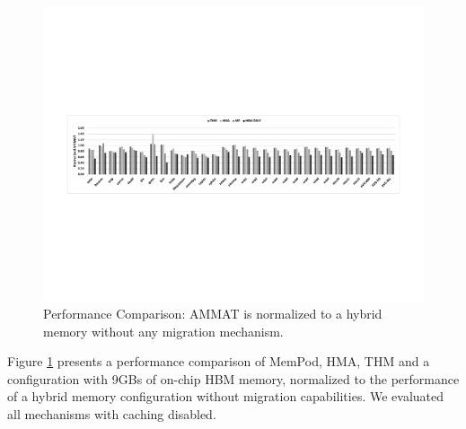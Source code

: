 \begin{figure}[t]
  \includegraphics[width=\textwidth]{figures/performance_over_nlm.pdf}
  \caption{Performance Comparison: AMMAT is normalized to a hybrid memory without any migration mechanism.}
  \label{fig:performance}
\end{figure}

Figure \ref{fig:performance} presents a performance comparison of MemPod, HMA, THM and a configuration with 9GBs of on-chip HBM memory, normalized to the performance of a hybrid memory configuration without migration capabilities. We evaluated all mechanisms with caching disabled. 

